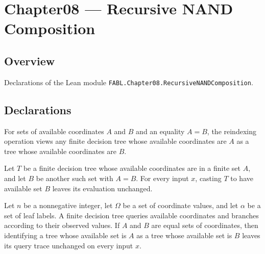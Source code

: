 \chapter{Chapter08 — Recursive NAND Composition}
\section{Overview}

Declarations of the Lean module \texttt{FABL.Chapter08.RecursiveNANDComposition}.

\section{Declarations}

\begin{definition}
\label{FABL.FiniteDecisionTree.castAvailable}
\leanok
{}
For sets of available coordinates $A$ and $B$ and an equality $A=B$, the reindexing
operation views any finite decision tree whose available coordinates are $A$ as a tree
whose available coordinates are $B$.
\end{definition}

\begin{theorem}
\label{FABL.FiniteDecisionTree.eval_castAvailable}
\leanok
{}
Let $T$ be a finite decision tree whose available coordinates are in a finite set $A$,
and let $B$ be another such set with $A=B$. For every input $x$, casting $T$ to have
available set $B$ leaves its evaluation unchanged.
\end{theorem}

\begin{theorem}
\label{FABL.FiniteDecisionTree.queryTrace_castAvailable}
\leanok
{}
Let $n$ be a nonnegative integer, let $\Omega$ be a set of coordinate values, and let
$\alpha$ be a set of leaf labels. A finite decision tree queries available coordinates
and branches according to their observed values. If $A$ and $B$ are equal sets of
coordinates, then identifying a tree whose available set is $A$ as a tree whose
available set is $B$ leaves its query trace unchanged on every input $x$.
\end{theorem}


